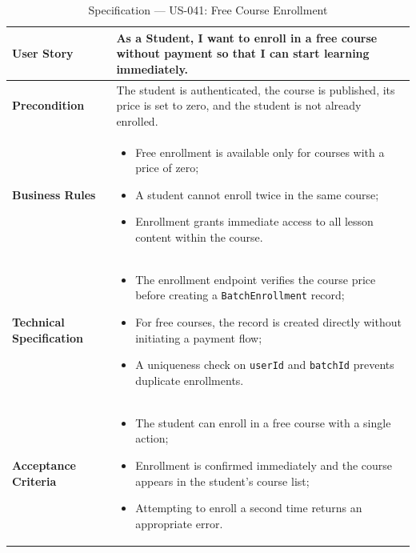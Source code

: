 \begin{table}[H]
\centering
\caption{Specification — US-041: Free Course Enrollment}
\label{tab:us041}
\renewcommand{\arraystretch}{1.2}
\begin{tabularx}{\textwidth}{|p{3.5cm}|X|}
\hline
\textbf{User Story} & As a Student, I want to enroll in a free course without payment so that I can start learning immediately. \\
\hline
\textbf{Precondition} & The student is authenticated, the course is published, its price is set to zero, and the student is not already enrolled. \\
\hline
\textbf{Business Rules} &
\begin{itemize}[noitemsep, topsep=2pt]
  \item Free enrollment is available only for courses with a price of zero;
  \item A student cannot enroll twice in the same course;
  \item Enrollment grants immediate access to all lesson content within the course.
\end{itemize} \\
\hline
\textbf{Technical Specification} &
\begin{itemize}[noitemsep, topsep=2pt]
  \item The enrollment endpoint verifies the course price before creating a \texttt{BatchEnrollment} record;
  \item For free courses, the record is created directly without initiating a payment flow;
  \item A uniqueness check on \texttt{userId} and \texttt{batchId} prevents duplicate enrollments.
\end{itemize} \\
\hline
\textbf{Acceptance Criteria} &
\begin{itemize}[noitemsep, topsep=2pt]
  \item The student can enroll in a free course with a single action;
  \item Enrollment is confirmed immediately and the course appears in the student's course list;
  \item Attempting to enroll a second time returns an appropriate error.
\end{itemize} \\
\hline
\end{tabularx}
\end{table}

